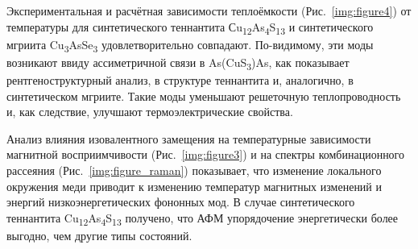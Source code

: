 




Экспериментальная и расчётная зависимости теплоёмкости (Рис.~\ref{img:figure4}) от температуры для синтетического теннантита Сu\textsubscript{12}As\textsubscript{4}S\textsubscript{13} и  синтетического мгриита Cu\textsubscript{3}AsSe\textsubscript{3} удовлетворительно совпадают.
По-видимому, эти моды возникают ввиду ассиметричной связи в As(CuS\textsubscript{3})As, как показывает рентгеноструктурный анализ, в структуре теннантита и, аналогично, в синтетическом мгриите. Такие моды уменьшают решеточную теплопроводность и, как следствие, улучшают термоэлектрические свойства.

Анализ влияния изовалентного замещения на температурные зависимости магнитной восприимчивости (Рис.~\ref{img:figure3}) и на спектры комбинационного рассеяния (Рис.~\ref{img:figure_raman}) показывает, что изменение локального окружения меди приводит к изменению температур магнитных изменений и энергий низкоэнергетических фононных мод. В случае синтетического теннантита Cu\textsubscript{12}As\textsubscript{4}S\textsubscript{13} получено, что АФМ упорядочение энергетически более выгодно, чем другие типы состояний.

